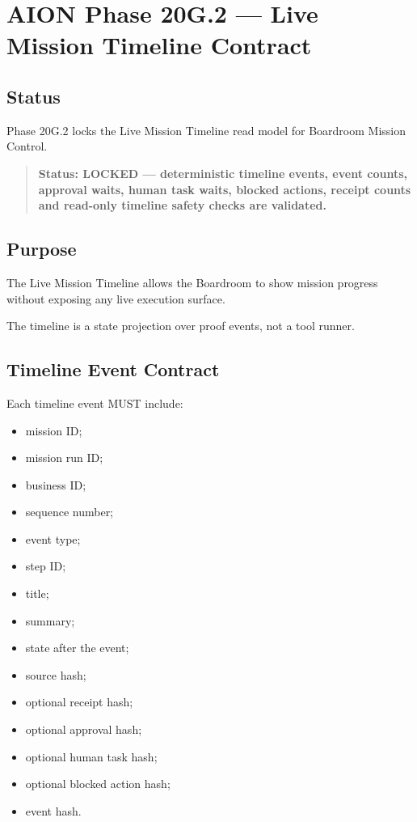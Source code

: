 \section{AION Phase 20G.2 --- Live Mission Timeline Contract}
\label{sec:aion-phase20g2-live-mission-timeline-contract}

\subsection{Status}

Phase 20G.2 locks the Live Mission Timeline read model for Boardroom Mission Control.

\begin{quote}
\textbf{Status: LOCKED --- deterministic timeline events, event counts, approval waits, human task waits, blocked actions, receipt counts and read-only timeline safety checks are validated.}
\end{quote}

\subsection{Purpose}

The Live Mission Timeline allows the Boardroom to show mission progress without exposing any live execution surface.

The timeline is a state projection over proof events, not a tool runner.

\subsection{Timeline Event Contract}

Each timeline event MUST include:

\begin{itemize}
  \item mission ID;
  \item mission run ID;
  \item business ID;
  \item sequence number;
  \item event type;
  \item step ID;
  \item title;
  \item summary;
  \item state after the event;
  \item source hash;
  \item optional receipt hash;
  \item optional approval hash;
  \item optional human task hash;
  \item optional blocked action hash;
  \item event hash.
\end{itemize}

